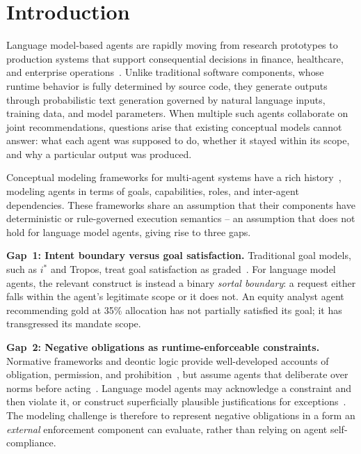 \documentclass[runningheads]{llncs}
\begin{document}
\section{Introduction}
\label{sec:introduction}

Language model-based agents are rapidly moving from research prototypes to production systems that support consequential decisions in finance, healthcare, and enterprise operations~\cite{wang2024survey,xi2023rise}.
Unlike traditional software components, whose runtime behavior is fully determined by source code, they generate outputs through probabilistic text generation governed by natural language inputs, training data, and model parameters. When multiple such agents collaborate on joint recommendations, questions arise that existing conceptual models cannot answer: what each agent was supposed to do, whether it stayed within its scope, and why a particular output was produced.

Conceptual modeling frameworks for multi-agent systems have a rich history~\cite{yu2011social,bresciani2004tropos,wooldridge2000gaia}, modeling agents in terms of goals, capabilities, roles, and inter-agent dependencies. These frameworks share an assumption that their components have deterministic or rule-governed execution semantics -- an assumption that does not hold for language model agents, giving rise to three gaps.

\textbf{Gap~1: Intent boundary versus goal satisfaction.}
Traditional goal models, such as $i^*$ and Tropos, treat goal satisfaction as graded~\cite{yu2011social}. For language model agents, the relevant construct is instead a binary \emph{sortal boundary}: a request either falls within the agent's legitimate scope or it does not. An equity analyst agent recommending gold at 35\% allocation has not partially satisfied its goal; it has transgressed its mandate scope.

\textbf{Gap~2: Negative obligations as runtime-enforceable constraints.} Normative frameworks and deontic logic provide well-developed accounts of obligation, permission, and prohibition~\cite{vonwright1951essay,governatori2005meeting,boella2006introduction}, but assume agents that deliberate over norms before acting~\cite{dignum1999autonomous}. Language model agents may acknowledge a constraint and then violate it, or construct superficially plausible justifications for exceptions~\cite{huang2023selfcorrect}. The modeling challenge is therefore to represent negative obligations in a form an \emph{external} enforcement component can evaluate, rather than relying on agent self-compliance.
\end{document}
